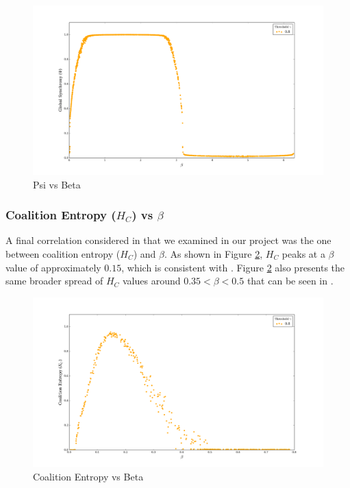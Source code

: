 \documentclass[a4paper,11pt]{article}
\begin{document}
\begin{figure}[H]
\begin{center}
\includegraphics[scale = 0.35]{figures/psi_vs_beta_ext}
\caption{
	Psi vs Beta
	\label{fig:psi-vs-beta-ext}
}
\end{center}
\end{figure}

\subsubsection{Coalition Entropy ($H_C$) vs $\beta$}
\label{sec:app:osc:res:hc-v-beta}

A final correlation considered in \cite{Shanahan2010} that we examined in our project was the one between coalition entropy ($H_C$) and $\beta$. As shown in Figure \ref{fig:hc-vs-beta-orig}, $H_C$ peaks at a $\beta$ value of approximately $0.15$, which is consistent with \cite{Shanahan2010}. Figure \ref{fig:hc-vs-beta-orig} also presents the same broader spread of $H_C$ values around $0.35 < \beta < 0.5$ that can be seen in \cite{Shanahan2010}.

\begin{figure}[H]
\begin{center}
\includegraphics[scale = 0.35]{figures/hc_vs_beta_orig}
\caption{
	Coalition Entropy vs Beta
	\label{fig:hc-vs-beta-orig}
}
\end{center}
\end{figure}
\end{document}
